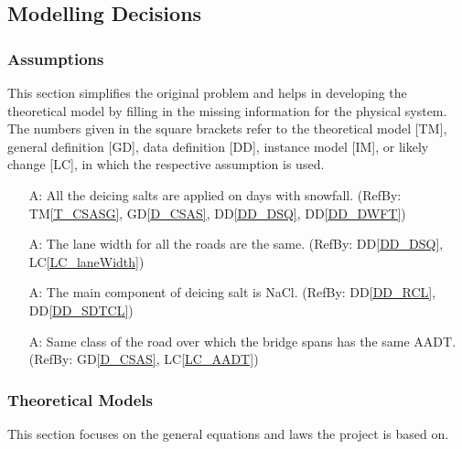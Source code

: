 \documentclass[12pt]{article}
\newcommand{\dref}[1]{GD\ref{#1}}
\newcommand{\ddref}[1]{DD\ref{#1}}
\newcommand{\tref}[1]{TM\ref{#1}}
\newcounter{assumpnum} %
\newcommand{\lcref}[1]{LC\ref{#1}}
\begin{document}
\subsection{Modelling Decisions}

\subsubsection{Assumptions} \label{sec_assumpt}

This section simplifies the original problem and helps in developing the
theoretical model by filling in the missing information for the physical system.
The numbers given in the square brackets refer to the theoretical model [TM],
general definition [GD], data definition [DD], instance model [IM], or likely
change [LC], in which the respective assumption is used.

\begin{itemize}

\item[A\refstepcounter{assumpnum}\theassumpnum \label{A_deicingSalts}:] All the deicing salts are applied on days with snowfall. (RefBy: \tref{T_CSASG}, \dref{D_CSAS}, \ddref{DD_DSQ}, \ddref{DD_DWFT})


\item[A\refstepcounter{assumpnum}\theassumpnum \label{A_laneWidth}:] The lane width for all the roads are the same. (RefBy: \ddref{DD_DSQ}, \lcref{LC_laneWidth})

\item[A\refstepcounter{assumpnum}\theassumpnum \label{A_NaCl}:] The main component of deicing salt is NaCl. (RefBy: \ddref{DD_RCL}, \ddref{DD_SDTCL})

\item[A\refstepcounter{assumpnum}\theassumpnum \label{A_AADT}:] Same class of the road over which the bridge spans has the same AADT. (RefBy: \dref{D_CSAS}, \lcref{LC_AADT})

\end{itemize}

\subsubsection{Theoretical Models}\label{sec_theoretical}
This section focuses on the general equations and laws the project is based on. 
\newline
\noindent
\end{document}
